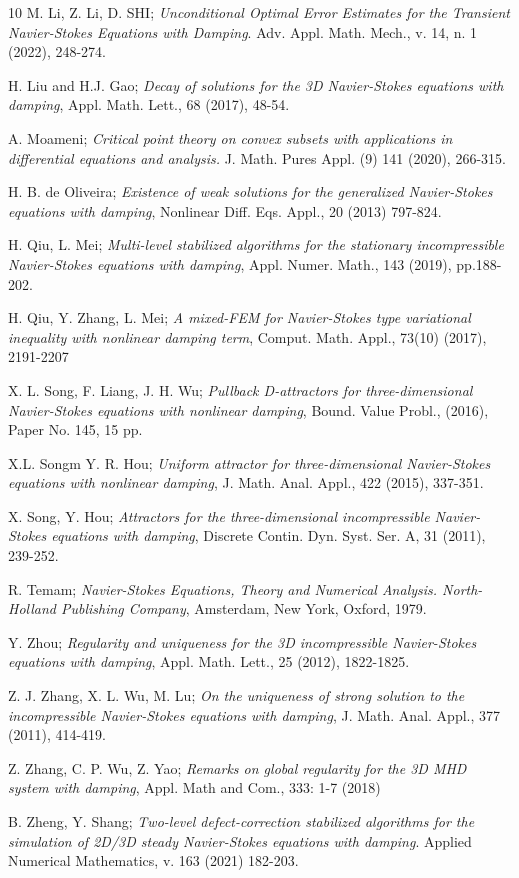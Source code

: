 \documentclass[reqno]{amsart}
\begin{document}
\begin{thebibliography}{10}
M. Li, Z. Li, D. SHI;
\emph{Unconditional Optimal Error Estimates for the Transient Navier-Stokes Equations
with Damping}. Adv. Appl. Math. Mech., v. 14, n. 1 (2022), 248-274.

H. Liu and H.J. Gao;
\emph{Decay of solutions for the 3D Navier-Stokes equations with damping}, Appl.
Math. Lett., 68 (2017), 48-54.

 A. Moameni;
\emph {Critical point theory on convex subsets with applications in differential
 equations and analysis.} J. Math. Pures Appl. (9) 141 (2020), 266-315.
	

H. B. de Oliveira;
\emph{Existence of weak solutions for the generalized Navier-Stokes equations with
damping}, Nonlinear Diff. Eqs. Appl., 20 (2013) 797-824.

H. Qiu, L. Mei;
\emph{Multi-level stabilized algorithms for the stationary incompressible Navier-Stokes
equations with damping}, Appl. Numer. Math., 143 (2019), pp.188-202.

 H. Qiu, Y. Zhang, L. Mei;
 \emph{A mixed-FEM for Navier-Stokes type variational
inequality with nonlinear damping term}, Comput. Math. Appl., 73(10) (2017),
2191-2207

X. L. Song, F. Liang, J. H. Wu;
\emph{Pullback D-attractors for three-dimensional Navier-Stokes
equations with nonlinear damping}, Bound. Value Probl., (2016), Paper No. 145, 15 pp.

X.L. Songm Y. R. Hou;
\emph{Uniform attractor for three-dimensional Navier-Stokes equations with nonlinear
damping}, J. Math. Anal. Appl., 422 (2015), 337-351.

X. Song, Y. Hou;
\emph{Attractors for the three-dimensional incompressible Navier-Stokes equations
with damping}, Discrete Contin. Dyn. Syst. Ser. A, 31 (2011), 239-252.

R. Temam;
\emph{Navier-Stokes Equations, Theory and Numerical Analysis.
North-Holland Publishing Company}, Amsterdam, New York, Oxford, 1979.

Y. Zhou;
\emph{Regularity and uniqueness for the 3D incompressible Navier-Stokes equations with
damping}, Appl. Math. Lett., 25 (2012), 1822-1825.

Z. J. Zhang, X. L. Wu, M. Lu;
\emph{On the uniqueness of strong solution to the incompressible
Navier-Stokes equations with damping}, J. Math. Anal. Appl., 377 (2011), 414-419.

Z. Zhang, C. P. Wu, Z. Yao;
\emph{Remarks on global regularity for the 3D MHD system
with damping}, Appl. Math and Com., 333: 1-7 (2018)

B. Zheng, Y. Shang;
\emph{Two-level defect-correction stabilized algorithms for the simulation of
2D/3D steady Navier-Stokes equations with damping}.
Applied Numerical Mathematics, v. 163 (2021) 182-203.

\end{thebibliography}
\end{document}

